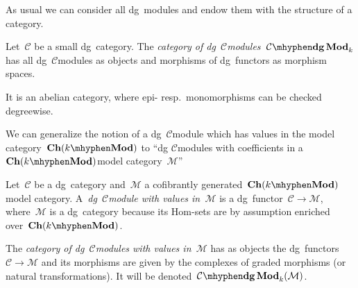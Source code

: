 As usual we can consider all dg~modules and endow them with the structure of a category.
\begin{definition}
  \label{definition:category-of-dg-modules}
  Let~$\mathcal{C}$ be a small dg~category. The \emph{category of dg~$\mathcal{C}$\dash modules}~$\dgMod{\mathcal{C}}_k$ has all dg~$\mathcal{C}$\dash modules as objects and morphisms of dg~functors as morphism spaces. 
\end{definition}
It is an abelian category, where epi- resp.\ monomorphisms can be checked degreewise.

We can generalize the notion of a dg~$\mathcal{C}$\dash module which has values in the model category~$\Ch(k\mhyphen\Mod)$ to ``dg $\mathcal{C}$\dash modules with coefficients in a~$\Ch(k\mhyphen\Mod)$\dash model category~$\mathcal{M}$''
\begin{definition}
  \label{definition:C-dgMod(M)}
  Let~$\mathcal{C}$ be a dg~category and~$\mathcal{M}$ a cofibrantly generated~$\Ch(k\mhyphen\Mod)$\dash model category. A~\emph{dg~$\mathcal{C}$\dash module with values in~$\mathcal{M}$} is a dg~functor~$\mathcal{C}\to\mathcal{M}$, where~$\mathcal{M}$ is a dg~category because its Hom-sets are by assumption enriched over~$\Ch(k\mhyphen\Mod)$.
  
  The \emph{category of dg~$\mathcal{C}$\dash modules with values in~$\mathcal{M}$} has as objects the dg~functors~$\mathcal{C}\to\mathcal{M}$ and its morphisms are given by the complexes of graded morphisms (or natural transformations). It will be denoted~$\dgMod{\mathcal{C}}_k(\mathcal{M})$.
\end{definition}

